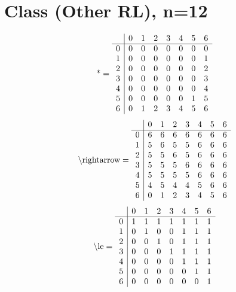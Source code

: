 \documentclass[11pt]{article}
\begin{document}
\section{Class (Other RL), n=12}
\[\text{*} = 
\begin{array}{r | r r r r r r r}
 & 0 & 1 & 2 & 3 & 4 & 5 & 6 \\ \hline
0 & 0 & 0 & 0 & 0 & 0 & 0 & 0 \\
1 & 0 & 0 & 0 & 0 & 0 & 0 & 1 \\
2 & 0 & 0 & 0 & 0 & 0 & 0 & 2 \\
3 & 0 & 0 & 0 & 0 & 0 & 0 & 3 \\
4 & 0 & 0 & 0 & 0 & 0 & 0 & 4 \\
5 & 0 & 0 & 0 & 0 & 0 & 1 & 5 \\
6 & 0 & 1 & 2 & 3 & 4 & 5 & 6 \\
\end{array}
\]
\[\text{\textbackslash rightarrow} = 
\begin{array}{r | r r r r r r r}
 & 0 & 1 & 2 & 3 & 4 & 5 & 6 \\ \hline
0 & 6 & 6 & 6 & 6 & 6 & 6 & 6 \\
1 & 5 & 6 & 5 & 5 & 6 & 6 & 6 \\
2 & 5 & 5 & 6 & 5 & 6 & 6 & 6 \\
3 & 5 & 5 & 5 & 6 & 6 & 6 & 6 \\
4 & 5 & 5 & 5 & 5 & 6 & 6 & 6 \\
5 & 4 & 5 & 4 & 4 & 5 & 6 & 6 \\
6 & 0 & 1 & 2 & 3 & 4 & 5 & 6 \\
\end{array}
\]
\[\text{\textbackslash le} = 
\begin{array}{r | r r r r r r r}
 & 0 & 1 & 2 & 3 & 4 & 5 & 6 \\ \hline
0 & 1 & 1 & 1 & 1 & 1 & 1 & 1 \\
1 & 0 & 1 & 0 & 0 & 1 & 1 & 1 \\
2 & 0 & 0 & 1 & 0 & 1 & 1 & 1 \\
3 & 0 & 0 & 0 & 1 & 1 & 1 & 1 \\
4 & 0 & 0 & 0 & 0 & 1 & 1 & 1 \\
5 & 0 & 0 & 0 & 0 & 0 & 1 & 1 \\
6 & 0 & 0 & 0 & 0 & 0 & 0 & 1 \\
\end{array}
\]
\end{document}
